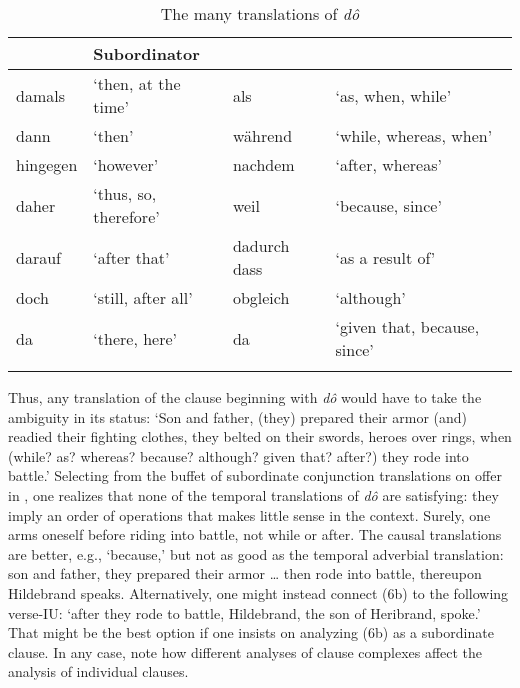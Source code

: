 \begin{table}
\caption{The many translations of \textit{dô}}
\label{tab:7.4}
\begin{tabular}{l@{~}l l@{~}l}
\lsptoprule
\multicolumn{2}{l}{Adverb} & \multicolumn{2}{l}{Subordinator}\\
\midrule
damals   &  ‘then, at the time’   & als &  ‘as, when, while’\\
dann     &  ‘then’                & während &  ‘while, whereas, when’\\
hingegen &  ‘however’             & nachdem &  ‘after, whereas’\\
daher    &  ‘thus, so, therefore’ & weil &  ‘because, since’\\
darauf   &  ‘after that’ & dadurch dass &  ‘as a result of’\\
doch     &  ‘still, after all’ & obgleich &  ‘although’\\
da       &  ‘there, here’ & da &  ‘given that, because, since’\\
\lspbottomrule
\end{tabular}
\end{table}


\noindent Thus, any translation of the clause beginning with \textit{dô} would have to take the ambiguity in its status: ‘Son and father, (they) prepared their armor (and) readied their fighting clothes, they belted on their swords, heroes over rings, when (while? as? whereas? because? although? given that? after?) they rode into battle.' Selecting from the buffet of subordinate conjunction translations on offer in , one realizes that none of the temporal translations of \textit{dô} are satisfying: they imply an order of operations that makes little sense in the context. Surely, one arms oneself before riding into battle, not while or after. The causal translations are better, e.g., ‘because,’ but not as good as the temporal adverbial translation: son and father, they prepared their armor … then rode into battle, thereupon Hildebrand speaks. Alternatively, one might instead connect (6b) to the following verse-IU: ‘after they rode to battle, Hildebrand, the son of Heribrand, spoke.' That might be the best option if one insists on analyzing (6b) as a subordinate clause. In any case, note how different analyses of clause complexes affect the analysis of individual clauses.

